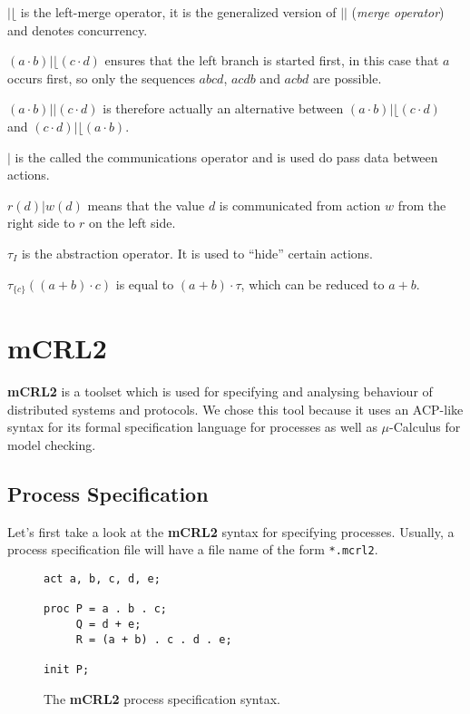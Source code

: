 \documentclass{clseminar}
\begin{document}
  $|\lfloor$ is the left-merge operator, it is the generalized version of $||$ (\textit{merge operator}) and denotes concurrency.
  \\
  \begin{example}
    $(a \cdot b) |\lfloor (c \cdot d)$ ensures that the left branch is started first, in this case that $a$ occurs first, so only the sequences $abcd$, $acdb$ and $acbd$ are possible.

    $(a \cdot b) || (c \cdot d)$ is therefore actually an alternative between $(a \cdot b) |\lfloor (c \cdot d)$ and $(c \cdot d) |\lfloor (a \cdot b)$.
  \end{example}

  $|$ is the called the communications operator and is used do pass data between actions.
  \\
  \begin{example}
     $r(d) | w(d)$ means that the value $d$ is communicated from action $w$ from the right side to $r$ on the left side.
  \end{example}

  $\tau_I$ is the abstraction operator. It is used to “hide” certain actions.
  \\
  \begin{example}
    $\tau_{\{c\}}((a+b)\cdot c)$ is equal to $(a + b) \cdot \tau$, which can be reduced to $a + b$.
  \end{example}

  \section{mCRL2}

  \textbf{mCRL2} is a toolset which is used for specifying and analysing behaviour of distributed systems and protocols. We chose this tool because it uses an ACP-like syntax for its formal specification language for processes as well as $\mu$-Calculus for model checking.

  \subsection{Process Specification}

  Let's first take a look at the \textbf{mCRL2} syntax for specifying processes. Usually, a process specification file will have a file name of the form \texttt{*.mcrl2}.

  \begin{figure}[!ht]
    \begin{lstlisting}[language=mCRL2]
act a, b, c, d, e;

proc P = a . b . c;
     Q = d + e;
     R = (a + b) . c . d . e;

init P;
    \end{lstlisting}
    \caption{The \textbf{mCRL2} process specification syntax.}
    \label{fig:mcrl2_syntax}
  \end{figure}
\end{document}

